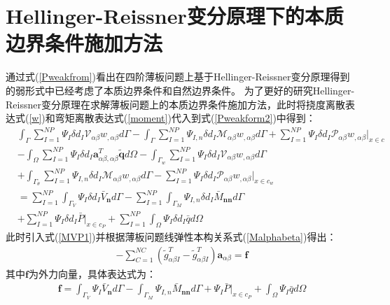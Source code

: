 \section{Hellinger-Reissner变分原理下的本质边界条件施加方法}
通过式(\ref{Pweakfrom})看出在四阶薄板问题上基于Hellinger-Reissner变分原理得到的弱形式中已经考虑了本质边界条件和自然边界条件。
为了更好的研究Hellinger-Reissner变分原理在求解薄板问题上的本质边界条件施加方法，此时将挠度离散表达式(\ref{w})和弯矩离散表达式(\ref{moment})代入到式(\ref{Pweakform2})中得到：
{\setlength\abovedisplayskip{0.5cm}
\setlength\belowdisplayskip{0.5cm}
\begin{equation}
\begin{split}
    &\int_{\Gamma}\sum_{I=1}^{N\!P}\Psi_I\delta{d_I}\mathcal{V}_{\alpha\beta}w_{,\alpha\beta}d\Gamma-\int_{\Gamma}\sum_{I=1}^{N\!P}\Psi_{I,n}\delta{d_I}\mathcal{M}_{\alpha\beta}w_{,\alpha\beta}d\Gamma+\sum_{I=1}^{N\!P}\Psi_I\delta{d_I}\mathcal{P}_{\alpha\beta}w_{,\alpha\beta}\vert_{x\in c}\\
    &-\int_{\Omega}\sum_{I=1}^{N\!P}\Psi_I\delta{d_I}\pmb{a}^T_{\alpha\beta,\alpha\beta}\tilde{\pmb q}d\Omega-\int_{\Gamma_w}\sum_{I=1}^{N\!P}\Psi_I\delta{d_I}\mathcal{V}_{\alpha\beta}w_{,\alpha\beta}d\Gamma\\
    &+\int_{\Gamma_{\theta}}\sum_{I=1}^{N\!P}\Psi_{I,n}\delta{d_I}\mathcal{M}_{\alpha\beta}w_{,\alpha\beta}d\Gamma
    -\sum_{I=1}^{N\!P}\Psi_I\delta{d_I}\mathcal{P}_{\alpha\beta}w_{,\alpha\beta}\vert_{x\in c_w}\\
    &=\sum_{I=1}^{N\!P}\int_{\Gamma_V}\Psi_I\delta{d_I}\bar{V}_{\pmb n}d\Gamma-\sum_{I=1}^{N\!P}\int_{\Gamma_M}\Psi_{I,n}\delta{d_I}\bar{M}_{\pmb{nn}}d\Gamma\\
    &+\sum_{I=1}^{N\!P}\Psi_I\delta{d_I}\bar{P}\vert_{x\in{c_P}}+\sum_{I=1}^{N\!P}\int_{\Omega}\Psi_I\delta{d_I}\bar{q}d\Omega
\end{split}
\end{equation}}
此时引入式(\ref{MVP1})并根据薄板问题线弹性本构关系式(\ref{Malphabeta})得出：
\begin{equation}\label{2}
\begin{split}
  -\sum_{C=1}^{N\!C}(\tilde{g}_{\alpha\beta I}^T-\tilde{g}_{\alpha\beta I}^T)\pmb a_{\alpha\beta}=\pmb{f}
\end{split}
\end{equation}
其中$\pmb{f}$为外力向量，具体表达式为：
\begin{equation}
\begin{split}
    \pmb{f}=\int_{\Gamma_V}\Psi_I\bar{V}_{\pmb n}d\Gamma-\int_{\Gamma_M}\Psi_{I,n}\bar{M}_{\pmb{nn}}d\Gamma+\Psi_I\bar{P}\vert_{x\in{c_P}}+\int_{\Omega}\Psi_I\bar{q}d\Omega
\end{split}
\end{equation}
